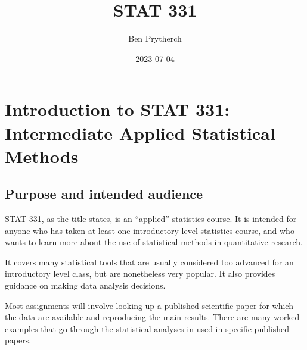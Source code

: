 \documentclass[
  letterpaper,
  DIV=11,
  numbers=noendperiod]{scrreprt}
\title{STAT 331}
\author{Ben Prytherch}
\date{2023-07-04}
\renewcommand*\contentsname{Table of contents}
\newcommand\contentsname{Table of contents}
\begin{document}
\maketitle
\ifdefined\Shaded\renewenvironment{Shaded}{\begin{tcolorbox}[borderline west={3pt}{0pt}{shadecolor}, breakable, enhanced, sharp corners, interior hidden, boxrule=0pt, frame hidden]}{\end{tcolorbox}}\fi

\renewcommand*\contentsname{Table of contents}
{
\hypersetup{linkcolor=}
\setcounter{tocdepth}{2}
\tableofcontents
}

\hypertarget{introduction-to-stat-331-intermediate-applied-statistical-methods}{%
\chapter*{Introduction to STAT 331: Intermediate Applied Statistical
Methods}\label{introduction-to-stat-331-intermediate-applied-statistical-methods}}


\hypertarget{purpose-and-intended-audience}{%
\section*{Purpose and intended
audience}\label{purpose-and-intended-audience}}


STAT 331, as the title states, is an ``applied'' statistics course. It
is intended for anyone who has taken at least one introductory level
statistics course, and who wants to learn more about the use of
statistical methods in quantitative research.

It covers many statistical tools that are usually considered too
advanced for an introductory level class, but are nonetheless very
popular. It also provides guidance on making data analysis decisions.

Most assignments will involve looking up a published scientific paper
for which the data are available and reproducing the main results. There
are many worked examples that go through the statistical analyses in
used in specific published papers.
\end{document}
